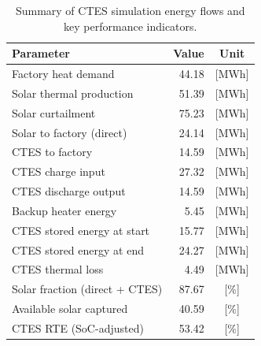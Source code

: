 \renewcommand{\arraystretch}{1.2}
\begin{table}[h]
\centering
\begin{tabular}{l|r c}
\hline
Parameter & Value & Unit \\
\hline
Factory heat demand & 44.18 & [MWh] \\
Solar thermal production & 51.39 & [MWh] \\
Solar curtailment & 75.23 & [MWh] \\
Solar to factory (direct) & 24.14 & [MWh] \\
CTES to factory & 14.59 & [MWh] \\
CTES charge input & 27.32 & [MWh] \\
CTES discharge output & 14.59 & [MWh] \\
Backup heater energy & 5.45 & [MWh] \\
CTES stored energy at start & 15.77 & [MWh] \\
CTES stored energy at end & 24.27 & [MWh] \\
CTES thermal loss & 4.49 & [MWh] \\
\hline
Solar fraction (direct + CTES) & 87.67 & [\%] \\
Available solar captured & 40.59 & [\%] \\
CTES RTE (SoC-adjusted) & 53.42 & [\%] \\
\hline
\end{tabular}
\caption{Summary of CTES simulation energy flows and key performance indicators.}
\label{tab:ctes-simulation-summary}
\end{table}
